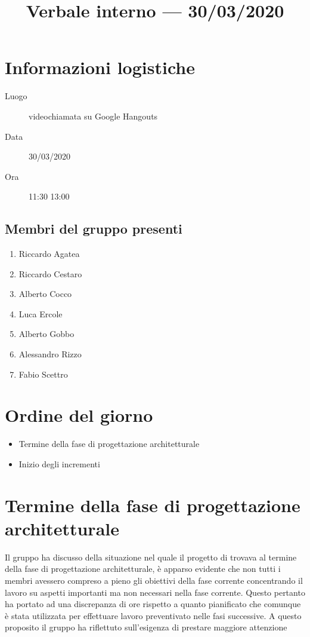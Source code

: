 \documentclass{article}
\title{Verbale interno --- 30/03/2020}
\begin{document}


\section{Informazioni logistiche}%
\label{sec:informazioni_logistiche}

\begin{description}
  \item [Luogo] videochiamata su Google Hangouts
  \item [Data] 30/03/2020
  \item [Ora] 11:30  13:00
\end{description}

\subsection{Membri del gruppo presenti}%
\label{sub:membri_del_gruppo_presenti}

\begin{enumerate}
  \item Riccardo Agatea
  \item Riccardo Cestaro
  \item Alberto Cocco
  \item Luca Ercole
  \item Alberto Gobbo
  \item Alessandro Rizzo
  \item Fabio Scettro
\end{enumerate}

\section{Ordine del giorno}%
\label{sec:ordine_del_giorno}

\begin{itemize}
  \item Termine della fase di progettazione architetturale
  \item Inizio degli incrementi
\end{itemize}

\section{Termine della fase di progettazione architetturale}%
\label{sec:termine_progettazione}
Il gruppo ha discusso della situazione nel quale il progetto di trovava al termine della fase di progettazione architetturale, è apparso evidente che non tutti i membri avessero compreso a pieno gli obiettivi della fase corrente concentrando il lavoro su aspetti importanti ma non necessari nella fase corrente.
Questo pertanto ha portato ad una discrepanza di ore rispetto a quanto pianificato che comunque è stata utilizzata per effettuare lavoro preventivato nelle fasi successive.
A questo proposito il gruppo ha riflettuto sull'esigenza di prestare maggiore attenzione
\end{document}
